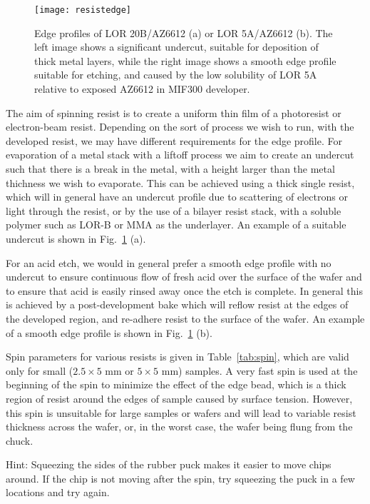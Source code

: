 \begin{figure}
    \texttt{[image: resistedge]}
    \caption[Edge profiles of two resists]
    {\label{fig:resistedge}Edge profiles of LOR 20B/AZ6612 (a) or LOR 5A/AZ6612 (b). The left image shows a significant undercut,
    suitable for deposition of thick metal layers, while the right image shows a smooth edge profile suitable for etching, and caused
    by the low solubility of LOR 5A relative to exposed AZ6612 in MIF300 developer. }
\end{figure}

The aim of spinning resist is to create a uniform thin film of a photoresist or electron-beam resist. Depending on the sort of process we wish
to run, with the developed resist, we may have different requirements for the edge profile. For evaporation of a metal stack with a liftoff process
we aim to create an undercut such that there is a break in the metal, with a height larger than the metal thichness we wish to evaporate. This can
be achieved using a thick single resist, which will in general have an undercut profile due to scattering of electrons or light through the resist, or by
the use of a bilayer resist stack, with a soluble polymer such as LOR-B or MMA as the underlayer. An example of a suitable undercut is shown in Fig.~\ref{fig:resistedge} (a).

For an acid etch, we would in general prefer a smooth edge profile with no undercut to ensure continuous flow of fresh acid over the
surface of the wafer and to ensure that acid is easily rinsed away once the etch is complete. In general this is achieved by a post-development
bake which will reflow resist at the edges of the developed region, and re-adhere resist to the surface of the wafer. An example of a
smooth edge profile is shown in Fig.~\ref{fig:resistedge} (b).

Spin parameters for various resists is given in Table~\ref{tab:spin}, which are valid only for small ($2.5 \times 5$ \si{\milli\meter} or $5 \times 5$ \si{\milli\meter})
samples. A very fast spin is used at the beginning of the spin to minimize the effect of the edge bead, which is a thick region of
resist around the edges of sample caused by surface tension. However, this spin is unsuitable for large samples or wafers and will lead
to variable resist thickness across the wafer, or, in the worst case, the wafer being flung from the chuck.

Hint: Squeezing the sides of the rubber puck makes it easier to move chips around. If the chip is not moving after the spin, try squeezing the
puck in a few locations and try again.

